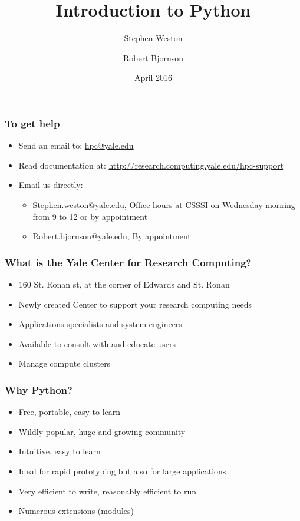 \documentclass[10pt]{beamer}
\title{Introduction to Python}
\author{{Stephen Weston} \and {Robert Bjornson}}
\institute[Yale]{
  Yale Center for Research Computing \\
  Yale University
}
\date{April 2016}
\begin{document}
\begin{frame}[plain]
  \titlepage
\end{frame}

\begin{frame}
\frametitle{To get help}
\begin{itemize}
\item Send an email to: \url{hpc@yale.edu}
\item Read documentation at: \url{http://research.computing.yale.edu/hpc-support}
\item Email us directly:
\begin{itemize}
\item Stephen.weston@yale.edu, Office hours at CSSSI on Wednesday morning from 9 to 12 or by appointment
\item Robert.bjornson@yale.edu, By appointment
\end{itemize}
\end{itemize}
\end{frame}

\begin{frame}
\frametitle{What is the Yale Center for Research Computing?}

\begin{itemize}
\item 160 St. Ronan st, at the corner of Edwards and St. Ronan
\item Newly created Center to support your research computing needs
\item Applications specialists and system engineers
\item Available to consult with and educate users
\item Manage compute clusters
\end{itemize}
\end{frame}

\begin{frame}
\frametitle{Why Python?}

\begin{itemize}
\item Free, portable, easy to learn
\item Wildly popular, huge and growing community
\item Intuitive, easy to learn
\item Ideal for rapid prototyping but also for large applications
\item Very efficient to write, reasonably efficient to run
\item Numerous extensions (modules)
\end{itemize}
\end{frame}
\end{document}
